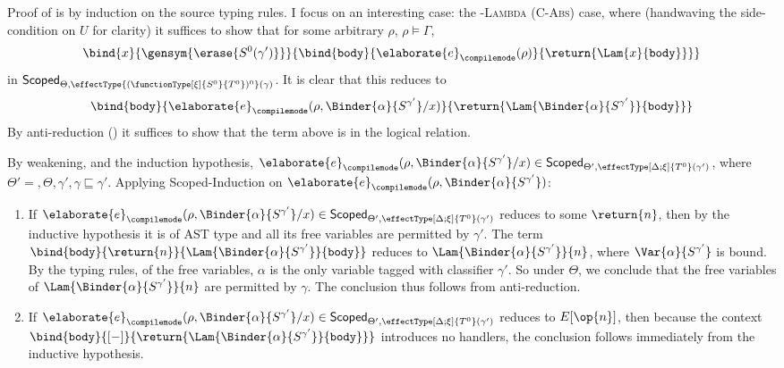 Proof of  is by induction on the source \sourceLang{} typing rules. I focus on an interesting case: the \textsc{\compilemode{}-Lambda} (\textsc{C-Abs}) case, where (handwaving the side-condition on $U$ for clarity) it suffices to show that for some arbitrary $\rho$, $\rho \vDash \Gamma$, 
\[\bind{x}{\gensym{\erase{S^0 (\gamma')}}}{\bind{\texttt{body}}{\elaborate{e}_{\compilemode}({\rho})}{\return{\Lam{x}{\texttt{body}}}}}\]
in $\scoped{\effectType{(\functionType[\xi]{S^0}{T^0})^0} (\gamma)}$. It is clear that this reduces to
\[{\bind{\texttt{body}}{\elaborate{e}_{\compilemode}({\rho, \Binder{\alpha}{S^{\gamma'}} / x})}{\return{\Lam{\Binder{\alpha}{S^{\gamma'}}}{\texttt{body}}}}}\]
 By anti-reduction () it suffices to show that the term above is in the logical relation. 
 
 By weakening, and the induction hypothesis, $\elaborate{e}_{\compilemode}({\rho, \Binder{\alpha}{S^{\gamma'}} / x}) \in \scoped[\Theta']{\effectType[\Delta; \xi]{T^{0}} (\gamma')}$, where $\Theta' = , \Theta, \gamma', \gamma \sqsubseteq \gamma'$. Applying \textsf{Scoped}-Induction on $\elaborate{e}_{\compilemode}({\rho, \Binder{\alpha}{S^{\gamma'}}})$:
\begin{enumerate}
  \item If $\elaborate{e}_{\compilemode}({\rho, \Binder{\alpha}{S^{\gamma'}} / x}) \in \scoped[\Theta']{\effectType[\Delta; \xi]{T^{0}} (\gamma')}$ reduces to some $\return{n}$, then by the inductive hypothesis it is of AST type and all its free variables are permitted by $\gamma'$. The term $\bind{\texttt{body}}{\return{n}}{\Lam{\Binder{\alpha}{S^{\gamma'}}}{\texttt{body}}}$ reduces to $\Lam{\Binder{\alpha}{S^{\gamma'}}}{n}$, where $\Var{\alpha}{S^{\gamma'}}$ is bound. By the typing rules, of the free variables, $\alpha$ is the only variable tagged with classifier $\gamma'$. So under $\Theta$, we conclude that the free variables of $\Lam{\Binder{\alpha}{S^{\gamma'}}}{n}$ are permitted by $\gamma$. The conclusion thus follows from anti-reduction.
  \item If $\elaborate{e}_{\compilemode}({\rho, \Binder{\alpha}{S^{\gamma'}} / x}) \in \scoped[\Theta']{\effectType[\Delta; \xi]{T^{0}} (\gamma')}$ reduces to $E[\op{n}]$, then because the context $\bind{\texttt{body}}{[-]}{\return{\Lam{\Binder{\alpha}{S^{\gamma'}}}{\texttt{body}}}}$ introduces no handlers, the conclusion follows immediately from the inductive hypothesis.
\end{enumerate}

